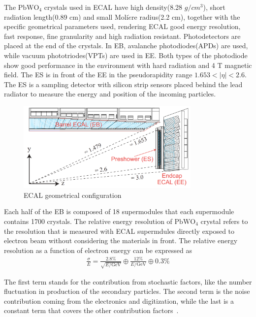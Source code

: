 The $\textrm{PbWO}_{4}$ crystals used in ECAL have high density(8.28 $g/cm^{3}$), short radiation length(0.89 cm) and small Moli$\grave{e}$re radius(2.2 cm), together with the specific geometrical parameters used, rendering ECAL  good energy resolution, fast response, fine granularity and high radiation resistant. Photodetectors are placed at the end of the crystals. In EB, avalanche photodiodes(APDs) are used, while vacuum phototriodes(VPTs) are used in EE. Both types of the photodiode show good performance in the environment with hard radiation and 4 T magnetic field. The ES is in front of the EE in the pseudorapidity range $1.653<|\eta|<2.6$. The ES is a sampling detector with silicon strip sensors placed behind the lead radiator to measure the energy and position of the incoming particles.  

\begin{figure}[htbp] 
\centering
\includegraphics[width=0.8\textwidth]{chapter3/ECAL_transverse.png}
\caption{ECAL geometrical configuration~\cite{CMS_TDR}}
\label{fig:ECAL_sketch}
\end{figure}

Each half of the EB is composed of 18 supermodules that each supermodule contains 1700 crystals. The relative energy resolution of $\textrm{PbWO}_{4}$ crystal  refers to the resolution that is measured with ECAL supermdules directly exposed to electron beam without considering the materials in front. The relative energy resolution as a function of electron energy can be expressed as 
\begin{align*}
\frac{\sigma}{E}=\frac{2.8\%}{\sqrt{E/\textrm{GeV}}}\oplus\frac{12\%}{E/\textrm{GeV}}\oplus 0.3\%
\end{align*}

The first term stands for the contribution from stochastic factors, like the number fluctuation in production of the secondary particles. The second term is the noise contribution coming from the electronics and digitization, while the last is a constant term that covers the other contribution factors~\cite{ECAL_EB_reso}.

